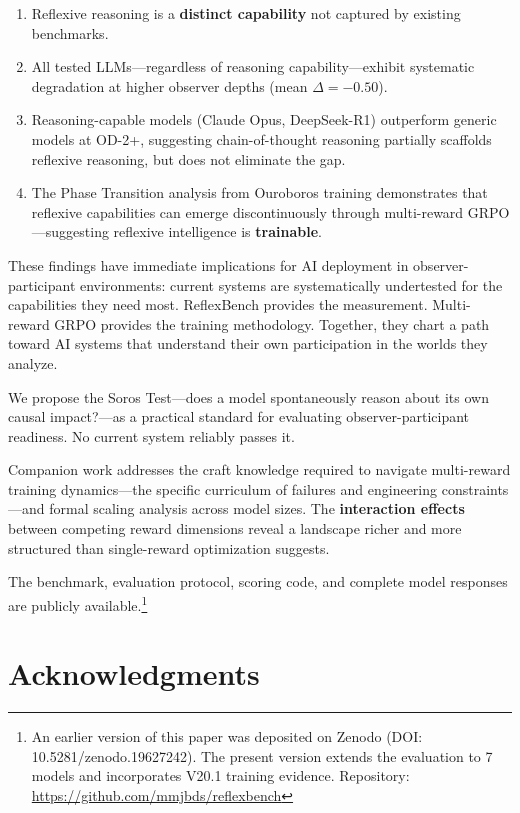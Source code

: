 \documentclass{article}
\begin{document}
\begin{enumerate}[leftmargin=*]
\item Reflexive reasoning is a \textbf{distinct capability} not captured by existing benchmarks.
\item All tested LLMs---regardless of reasoning capability---exhibit systematic degradation at higher observer depths (mean $\Delta = -0.50$).
\item Reasoning-capable models (Claude Opus, DeepSeek-R1) outperform generic models at OD-2+, suggesting chain-of-thought reasoning partially scaffolds reflexive reasoning, but does not eliminate the gap.
\item The Phase Transition analysis from Ouroboros training demonstrates that reflexive capabilities can emerge discontinuously through multi-reward GRPO---suggesting reflexive intelligence is \textbf{trainable}.
\end{enumerate}

These findings have immediate implications for AI deployment in observer-participant environments: current systems are systematically undertested for the capabilities they need most. ReflexBench provides the measurement. Multi-reward GRPO provides the training methodology. Together, they chart a path toward AI systems that understand their own participation in the worlds they analyze.

We propose the Soros Test---does a model spontaneously reason about its own causal impact?---as a practical standard for evaluating observer-participant readiness. No current system reliably passes it.

Companion work addresses the craft knowledge required to navigate multi-reward training dynamics---the specific curriculum of failures and engineering constraints---and formal scaling analysis across model sizes. The \textbf{interaction effects} between competing reward dimensions reveal a landscape richer and more structured than single-reward optimization suggests.

The benchmark, evaluation protocol, scoring code, and complete model responses are publicly available.\footnote{An earlier version of this paper was deposited on Zenodo (DOI: 10.5281/zenodo.19627242). The present version extends the evaluation to 7 models and incorporates V20.1 training evidence. Repository: \url{https://github.com/mmjbds/reflexbench}}

\section*{Acknowledgments}
\end{document}
